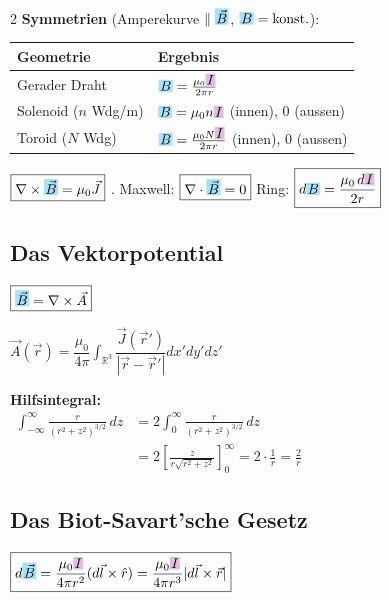 \documentclass[10pt,a4paper]{article}
\newcommand{\icc}[1]{{\setlength\fboxsep{1pt}\colorbox{violet!25}{\ensuremath{#1}}}}
\newcommand{\bfc}[1]{{\setlength\fboxsep{1pt}\colorbox{cyan!35}{\ensuremath{#1}}}}
\begin{document}
\begin{multicols}{2}
\textbf{Symmetrien} (Amperekurve $\parallel\bfc{\vec{B}}$, $\bfc{B}=\text{konst.}$):
\par
{\footnotesize\renewcommand{\arraystretch}{1.1}
\begin{tabularx}{\linewidth}{|l|X|}
\hline
\textbf{Geometrie} & \textbf{Ergebnis} \\
\hline
Gerader Draht & $\bfc{B}=\tfrac{\mu_0\icc{I}}{2\pi r}$ \\
Solenoid ($n$ Wdg/m) & $\bfc{B}=\mu_0 n\icc{I}$ (innen), $0$ (aussen) \\
Toroid ($N$ Wdg) & $\bfc{B}=\tfrac{\mu_0 N\icc{I}}{2\pi r}$ (innen), $0$ (aussen) \\
\hline
\end{tabularx}}

$\boxed{\nabla\times\bfc{\vec{B}}=\mu_0\vec{J}}$ . Maxwell: $\boxed{\nabla\cdot\bfc{\vec{B}}=0}$ \quad Ring: $\boxed{d\bfc{B}=\dfrac{\mu_0\,d\icc{I}}{2r}}$

\subsection{Das Vektorpotential}

\noindent
\begin{minipage}[t]{0.44\linewidth}
$\boxed{\bfc{\vec{B}}=\nabla\times\vec{A}}$

\medskip
$\boxed{\vec{A}(\vec{r})=\dfrac{\mu_0}{4\pi}\int_{\mathbb{R}^3}\dfrac{\vec{J}(\vec{r}')}{|\vec{r}-\vec{r}'|}dx'dy'dz'}$
\end{minipage}\hfill
\begin{minipage}[t]{0.53\linewidth}
{\footnotesize
\textbf{Hilfsintegral:}\\[3pt]
$\begin{aligned}
\int_{-\infty}^{\infty}\frac{r}{(r^2+z^2)^{3/2}}\,dz
&=2\int_{0}^{\infty}\frac{r}{(r^2+z^2)^{3/2}}\,dz\\[2pt]
&=2\left[\frac{z}{r\sqrt{r^2+z^2}}\right]_{0}^{\infty}=2\cdot\frac{1}{r}=\frac{2}{r}
\end{aligned}$
}
\end{minipage}

\subsection{Das Biot-Savart'sche Gesetz}

$\boxed{d\bfc{\vec{B}}=\dfrac{\mu_0 \icc{I}}{4\pi r^2}(d\vec{l}\times\hat{r})=\dfrac{\mu_0 \icc{I}}{4\pi r^3}|d\vec{l}\times\vec{r}|}$


\end{multicols}
\end{document}
